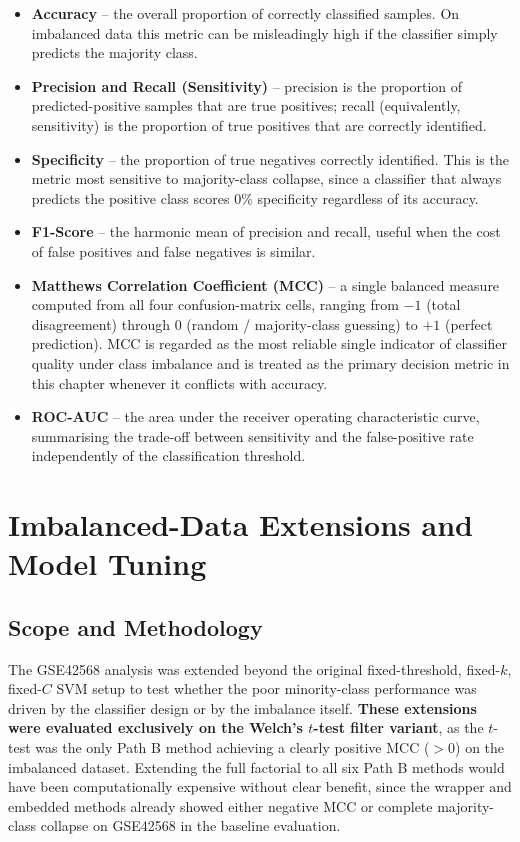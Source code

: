 \begin{itemize}
    \item \textbf{Accuracy} -- the overall proportion of correctly classified samples. On imbalanced data this metric can be misleadingly high if the classifier simply predicts the majority class.
    \item \textbf{Precision and Recall (Sensitivity)} -- precision is the proportion of predicted-positive samples that are true positives; recall (equivalently, sensitivity) is the proportion of true positives that are correctly identified.
    \item \textbf{Specificity} -- the proportion of true negatives correctly identified. This is the metric most sensitive to majority-class collapse, since a classifier that always predicts the positive class scores $0\%$ specificity regardless of its accuracy.
    \item \textbf{F1-Score} -- the harmonic mean of precision and recall, useful when the cost of false positives and false negatives is similar.
    \item \textbf{Matthews Correlation Coefficient (MCC)} -- a single balanced measure computed from all four confusion-matrix cells, ranging from $-1$ (total disagreement) through $0$ (random / majority-class guessing) to $+1$ (perfect prediction). MCC is regarded as the most reliable single indicator of classifier quality under class imbalance and is treated as the primary decision metric in this chapter whenever it conflicts with accuracy.
    \item \textbf{ROC-AUC} -- the area under the receiver operating characteristic curve, summarising the trade-off between sensitivity and the false-positive rate independently of the classification threshold.
\end{itemize}

\section{Imbalanced-Data Extensions and Model Tuning}

\subsection{Scope and Methodology}

The GSE42568 analysis was extended beyond the original fixed-threshold, fixed-$k$, fixed-$C$ SVM setup to test whether the poor minority-class performance was driven by the classifier design or by the imbalance itself. \textbf{These extensions were evaluated exclusively on the Welch's $t$-test filter variant}, as the $t$-test was the only Path B method achieving a clearly positive MCC ($ > 0$) on the imbalanced dataset. Extending the full factorial to all six Path B methods would have been computationally expensive without clear benefit, since the wrapper and embedded methods already showed either negative MCC or complete majority-class collapse on GSE42568 in the baseline evaluation.

